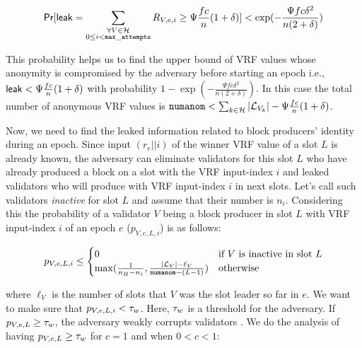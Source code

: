 \begin{equation}\label{eq:beforeepcoh}
\mathsf{Pr}[\mathsf{leak} = \sum_{\substack{ \forall V \in \mathcal{H} \\0\leq i < \mathtt{max\_attempts}}} R_{V,e,i} \geq \Psi \frac{fc}{n} (1+ \delta)] < \exp(-\frac{\Psi f c\delta^2}{n(2+\delta)}) \nonumber
\end{equation}


This probability helps us to find the upper bound of VRF values whose anonymity is compromised by the adversary before starting an epoch i.e., $ \mathsf{leak} < \Psi \frac{fc}{n} (1+ \delta) $ with probability $ 1- \exp(-\frac{\Psi f c\delta^2}{n(2+\delta)}) $. In this case the total number of anonymous VRF values is $  \mathtt{numanom} < \sum_{k \in \mathcal{H}} |\mathcal{L}_{V_k}| -  \Psi \frac{fc}{n} (1+ \delta)$.

Now, we need to find the leaked information related to block producers' identity during an epoch. 
Since input $ (r_e||i) $ of the winner VRF value of a slot $ L $ is already known, the adversary can eliminate validators for this slot $ L $ who have already produced a block on a slot with the VRF input-index $ i $ and leaked validators who will produce with VRF input-index $ i $ in next slots. Let's call such validators \emph{inactive} for slot $ L $ and assume that their number is $ n_i $. Considering this the probability of a validator $ V $ being a block producer in slot $ L $ with VRF input-index $ i $ of an epoch $ e $ ($ p_{V,e, L, i} $)  is as follows:

\begin{equation*}
p_{V,e, L, i} \leq \begin{cases}
0 &\text{if } V \text{ is inactive in slot } L\\
\max(\frac{1}{n_H - n_i},\frac{|\mathcal{L}_V|- \ell_V}{\mathtt{numanom}-(L-1)})&\text{otherwise}
\end{cases}
\end{equation*}

where  $ \ell_V $ is the number of slots that $ V $ was the slot leader so far in $ e $. We want to make sure that $ p_{V,e,L,i} < \tau_w$. Here, $ \tau_w $ is a threshold for the adversary. If $ p_{V,e,L} \geq \tau_w $, the adversary weakly corrupts validators . We do the analysis of having $ p_{V,e,L} \geq \tau_w $ for $ c =1 $ and when $ 0 < c < 1 $:

